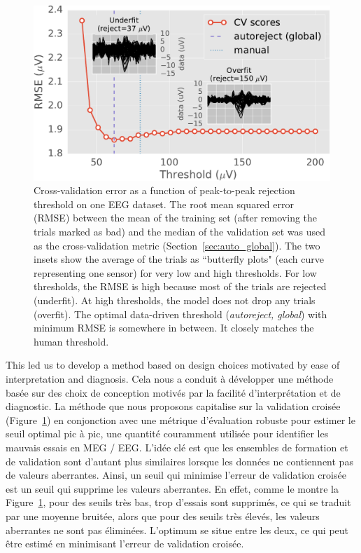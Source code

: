 \begin{figure}[htb]
	\centering
	\includegraphics[width=0.8\linewidth]{figures/figure1.pdf}
    \caption[]{Cross-validation error as a function of peak-to-peak rejection threshold on one EEG dataset. The root mean squared error (RMSE) between the mean of the training set (after removing the trials marked as bad) and the median of the validation set was used as the cross-validation metric (Section~\ref{sec:auto_global}). The two insets show the average of the trials as ``butterfly plots" (each curve representing one sensor) for very low and high thresholds. For low thresholds, the RMSE is high because most of the trials are rejected (underfit). At high thresholds, the model does not drop any trials (overfit). The optimal data-driven threshold (\emph{autoreject, global}) with minimum RMSE is somewhere in between. It closely matches the human threshold.}
    \label{fig:sommaire:cross_val}
\end{figure}

This led us to develop a method based on design choices motivated by ease of interpretation and diagnosis. 
Cela nous a conduit à développer une méthode basée sur des choix de conception motivés par la facilité d’interprétation et de diagnostic. La méthode que nous proposons capitalise sur la validation croisée (Figure~\ref{fig:sommaire:cross_val}) en conjonction avec une métrique d'évaluation robuste pour estimer le seuil optimal pic à pic, une quantité couramment utilisée pour identifier les mauvais essais en MEG / EEG. L'idée clé est que les ensembles de formation et de validation sont d’autant plus similaires lorsque les données ne contiennent pas de valeurs aberrantes. Ainsi, un seuil qui minimise l'erreur de validation croisée est un seuil qui supprime les valeurs aberrantes. En effet, comme le montre la Figure~\ref{fig:sommaire:cross_val}, pour des seuils très bas, trop d'essais sont supprimés, ce qui se traduit par une moyenne bruitée, alors que pour des seuils très élevés, les valeurs aberrantes ne sont pas éliminées. L’optimum se situe entre les deux, ce qui peut être estimé en minimisant l’erreur de validation croisée.

